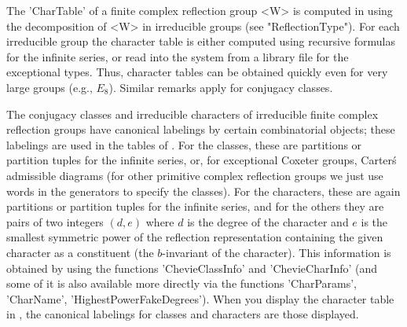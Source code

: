 \def\Sym{{\mathfrak S}}


The 'CharTable' of a finite complex  reflection group <W> is computed in
{\CHEVIE}  using the  decomposition of  <W> in  irreducible groups  (see
"ReflectionType").  For each  irreducible group  the character  table is
either computed  using recursive  formulas for  the infinite  series, or
read into  the system  from a  library file  for the  exceptional types.
Thus,  character tables  can be  obtained  quickly even  for very  large
groups (e.g., $E_8$). Similar remarks apply for conjugacy classes.

The  conjugacy  classes  and  irreducible  characters of irreducible finite
complex reflection groups have canonical labelings by certain combinatorial
objects;  these  labelings  are  used  in  the  tables  of \CHEVIE. For the
classes,  these are partitions or partition tuples for the infinite series,
or,   for  exceptional   Coxeter  groups,   Carter\'s  admissible  diagrams
\cite{Car72}  (for other  primitive complex  reflection groups  we just use
words  in the generators to specify the classes). For the characters, these
are  again partitions or partition tuples  for the infinite series, and for
the  others they are pairs of two  integers $(d,e)$ where $d$ is the degree
of  the character and $e$ is the smallest symmetric power of the reflection
representation  containing  the  given  character  as  a  constituent  (the
$b$-invariant  of the character). This information is obtained by using the
functions  'ChevieClassInfo' and 'ChevieCharInfo'  (and some of  it is also
available   more  directly  via  the  functions  'CharParams',  'CharName',
'HighestPowerFakeDegrees').  When you display the  character table in \GAP,
the canonical labelings for classes and characters are those displayed.

